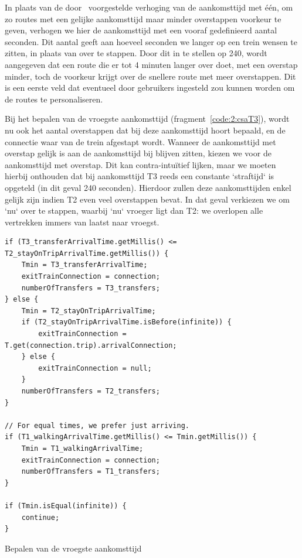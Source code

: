 In plaats van de door~\cite{strasser17} voorgestelde verhoging van de aankomsttijd met één, om zo routes met een gelijke aankomsttijd maar minder overstappen voorkeur te geven, verhogen we hier de aankomsttijd met een vooraf gedefinieerd aantal seconden. Dit aantal geeft aan hoeveel seconden we langer op een trein wensen te zitten, in plaats van over te stappen. Door dit in te stellen op 240, wordt aangegeven dat een route die er tot 4 minuten langer over doet, met een overstap minder, toch de voorkeur krijgt over de snellere route met meer overstappen. Dit is een eerste veld dat eventueel door gebruikers ingesteld zou kunnen worden om de routes te personaliseren.

Bij het bepalen van de vroegste aankomsttijd (fragment~\ref{code:2:csaT3}), wordt nu ook het aantal overstappen dat bij deze aankomsttijd hoort bepaald, en de connectie waar van de trein afgestapt wordt. Wanneer de aankomsttijd met overstap gelijk is aan de aankomsttijd bij blijven zitten, kiezen we voor de aankomsttijd met overstap. Dit kan contra-intuïtief lijken, maar we moeten hierbij onthouden dat bij aankomsttijd T3 reeds een constante `straftijd` is opgeteld (in dit geval 240 seconden). Hierdoor zullen deze aankomsttijden enkel gelijk zijn indien T2 even veel overstappen bevat. In dat geval verkiezen we om `nu` over te stappen, waarbij `nu` vroeger ligt dan T2: we overlopen alle vertrekken immers van laatst naar vroegst.

\begin{listing}[htb]
\begin{verbatim}
if (T3_transferArrivalTime.getMillis() <= T2_stayOnTripArrivalTime.getMillis()) {
	Tmin = T3_transferArrivalTime;
	exitTrainConnection = connection;
	numberOfTransfers = T3_transfers;
} else {
	Tmin = T2_stayOnTripArrivalTime;
	if (T2_stayOnTripArrivalTime.isBefore(infinite)) {
		exitTrainConnection = T.get(connection.trip).arrivalConnection;
	} else {
		exitTrainConnection = null;
	}
	numberOfTransfers = T2_transfers;
}

// For equal times, we prefer just arriving.
if (T1_walkingArrivalTime.getMillis() <= Tmin.getMillis()) {
	Tmin = T1_walkingArrivalTime;
	exitTrainConnection = connection;
	numberOfTransfers = T1_transfers;
}

if (Tmin.isEqual(infinite)) {
	continue;
}
		\end{verbatim}
		\caption[CSA: Bepalen van vroegste aankomsttijd]{Bepalen van de vroegste aankomsttijd}
		\label{code:2:csaMin}
\end{listing}

